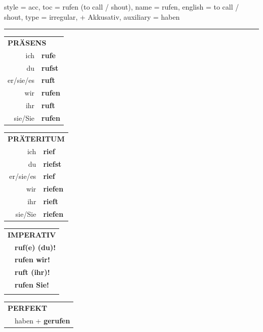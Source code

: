 \begin{verbentry}{
  style = {acc},
  toc = {rufen (to call / shout)},
  name = {rufen},
  english = {to call / shout},
  type = {irregular, + Akkusativ},
  auxiliary = {haben}
}
 
    
     \vspace{5pt}

    \hrule
    
    \vspace{5pt}

  \begin{tabular}{rl}
     \multicolumn{2}{l}{\textbf{PRÄSENS} }\\
    ich & \textbf{rufe}\\
    du & \textbf{rufst}\\
    er/sie/es & \textbf{ruft}\\
    wir & \textbf{rufen}\\
    ihr & \textbf{ruft}\\
    sie/Sie & \textbf{rufen}\\
  \end{tabular}
  \hfill
     \begin{tabular}{rl}
    \multicolumn{2}{l}{\textbf{PRÄTERITUM} }\\
    ich & \textbf{rief}\\
    du & \textbf{riefst}\\
    er/sie/es & \textbf{rief}\\
    wir & \textbf{riefen}\\
    ihr & \textbf{rieft}\\
    sie/Sie & \textbf{riefen}\\
  \end{tabular}
  \hfill
  \begin{tabular}{rl}
     \multicolumn{2}{l}{\textbf{IMPERATIV} }\\
   & \textbf{ruf(e) (du)!}\\
   & \textbf{rufen wir!}\\
   & \textbf{ruft (ihr)!}\\
   & \textbf{rufen Sie!}\\
   & \vspace{10pt}
  \end{tabular}

    \vspace{10pt}

 \begin{tabular}{rl}
     \multicolumn{2}{l}{\textbf{PERFEKT}}\\
   & haben + \textbf{gerufen}\\
  \end{tabular}
\hfill
   \begin{tabular}{rl}
   

\end{tabular}
\end{verbentry}
